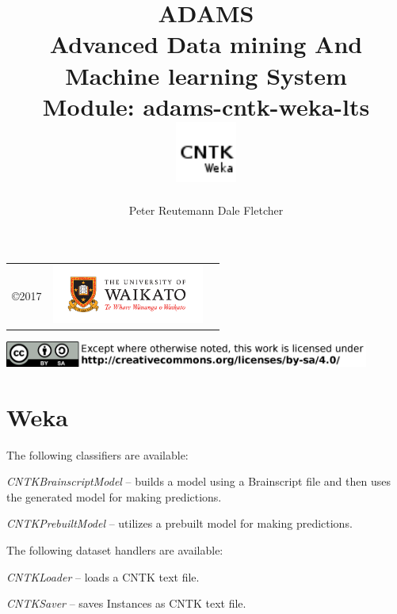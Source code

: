\documentclass[a4paper]{book}
\title{
  \textbf{ADAMS} \\
  {\Large \textbf{A}dvanced \textbf{D}ata mining \textbf{A}nd \textbf{M}achine
  learning \textbf{S}ystem} \\
  {\Large Module: adams-cntk-weka-lts} \\
  \vspace{1cm}
  \includegraphics[width=2cm]{images/cntk-weka-lts-module.png} \\
}
\author{
  Peter Reutemann
  Dale Fletcher
}
\begin{document}
\begin{titlepage}
\maketitle

\thispagestyle{empty}
\center
\begin{table}[b]
	\begin{tabular}{c l l}
		\parbox[c][2cm]{2cm}{\copyright 2017} &
		\parbox[c][2cm]{5cm}{\includegraphics[width=5cm]{images/coat_of_arms.pdf}} \\
	\end{tabular}
	\includegraphics[width=12cm]{images/cc.png} \\
\end{table}

\end{titlepage}

\tableofcontents

\chapter{Weka}
The following classifiers are available:
\begin{tight_itemize}
  \item \textit{CNTKBrainscriptModel} -- builds a model using a Brainscript file
  and then uses the generated model for making predictions.
  \item \textit{CNTKPrebuiltModel} -- utilizes a prebuilt model for making predictions.
\end{tight_itemize}
The following dataset handlers are available:
\begin{tight_itemize}
  \item \textit{CNTKLoader} -- loads a CNTK text file.
  \item \textit{CNTKSaver} -- saves Instances as CNTK text file.
\end{tight_itemize}


\end{document}
